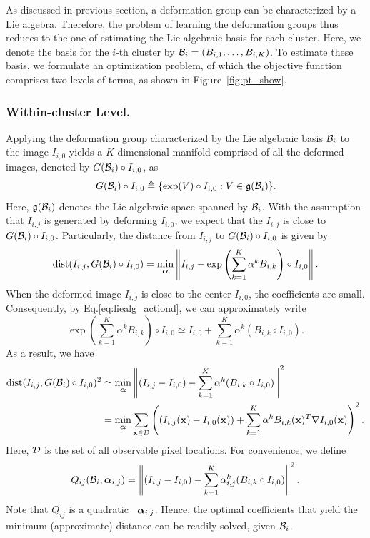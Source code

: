 As discussed in previous section, a deformation group can be
characterized by a Lie algebra. Therefore, the problem of learning the
deformation groups thus reduces to the one of estimating the Lie
algebraic basis for each cluster. Here, we denote the basis for the
$i$-th cluster by $\mathcal{B}_i = (B_{i,1}, \ldots, B_{i,K})$.
To estimate these basis, we formulate an optimization problem, of
which the objective function comprises two levels of terms, as shown
in Figure~\ref{fig:pt_show}.


\subsubsection{Within-cluster Level.}
%
Applying the deformation group characterized by the Lie
algebraic basis $\mathcal{B}_i$ to the image $I_{i,0}$ yields a
$K$-dimensional manifold comprised of all the deformed images,
denoted by $G(\mathcal{B}_i) \circ I_{i,0}$, as
\begin{equation}
    G(\mathcal{B}_i) \circ I_{i,0} \triangleq
    \{ \exp(V) \circ I_{i,0}: V \in \mathfrak{g}(\mathcal{B}_i) \}.
\end{equation}
Here, $\mathfrak{g}(\mathcal{B}_i)$ denotes the Lie algebraic space spanned by
$\mathcal{B}_i$.
With the assumption that $I_{i,j}$ is generated by deforming
$I_{i,0}$, we expect that the $I_{i,j}$ is close to
$G(\mathcal{B}_i) \circ I_{i,0}$. Particularly, the distance from $I_{i,j}$
to $G(\mathcal{B}_i) \circ I_{i,0}$ is given by
\begin{equation}
    \mathrm{dist}(I_{i,j}, G(\mathcal{B}_i) \circ I_{i,0})
    = \min_{\boldsymbol{\alpha}} \left\| I_{i,j} -
      \exp \left(\sum_{k=1}^K \alpha^k B_{i,k} \right) \circ I_{i,0}
    \right\|.    
\end{equation}
When the deformed image $I_{i,j}$ is close to the center $I_{i,0}$,
the coefficients are small. Consequently, by
Eq.\eqref{eq:liealg_actiond}, we can approximately write
\begin{equation}
    \exp \left( \sum_{k=1}^K \alpha^k B_{i,k} \right) \circ I_{i,0}
    \simeq
    I_{i,0} + \sum_{k=1}^K \alpha^k (B_{i,k} \circ I_{i,0}).
\end{equation}
As a result, we have
\begin{align} \label{eq:approx_dist2}
    \mathrm{dist}(I_{i,j}, G(\mathcal{B}_i) \circ I_{i,0})^2
    &\simeq
    \min_{\boldsymbol{\alpha}} \left \|
      (I_{i,j} - I_{i,0}) -
      \sum_{k=1}^K \alpha^k (B_{i,k} \circ I_{i,0})
    \right \|^2 \notag \\
    &=
    \min_{\boldsymbol{\alpha}} \sum_{{\mathbf{x}} \in \mathcal{D}} \left(
      (I_{i,j}({\mathbf{x}}) - I_{i,0}({\mathbf{x}})) +
      \sum_{k=1}^K \alpha^k B_{i,k}({\mathbf{x}})^T \nabla I_{i,0}({\mathbf{x}})
    \right)^2.
\end{align}
Here, $\mathcal{D}$ is the set of all observable pixel locations.
For convenience, we define
\begin{equation}
    Q_{ij}(\mathcal{B}_i, \boldsymbol{\alpha}_{i,j}) =
    \left \| (I_{i,j} - I_{i,0}) -
      \sum_{k=1}^K \alpha_{i,j}^k (B_{i,k}
      \circ I_{i,0})
    \right \|^2.
\end{equation}
Note that $Q_{ij}$ is a quadratic \wrt~$\boldsymbol{\alpha}_{i,j}$. Hence, the
optimal coefficients that yield the minimum (approximate) distance can
be readily solved, given $\mathcal{B}_i$.


